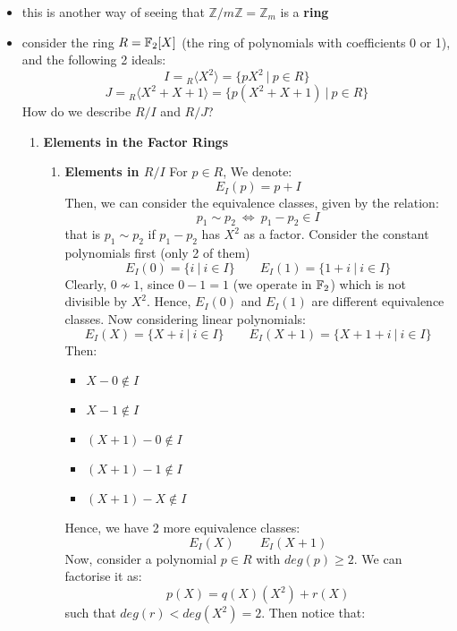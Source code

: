 \documentclass{exam}
\begin{document}
\begin{itemize}
    \item this is another way of seeing that $\mathbb{Z}/m\mathbb{Z} = \mathbb{Z}_m$ is a \textbf{ring}
    \item consider the ring $R = \mathbb{F}_2[X]$ (the ring of polynomials with coefficients 0 or 1), and the following 2 ideals:
    \[
    I = {}_R\langle X^2 \rangle = \{pX^2 \ | \ p \in R\}
    \]
    \[
    J = {}_R\langle X^2 + X + 1 \rangle = \{p(X^2 + X + 1) \ | \ p \in R\}
    \]
    How do we describe $R/I$ and $R/J$?
    \begin{enumerate}
        \item \textbf{Elements in the Factor Rings}
        \begin{enumerate}
            \item \textbf{Elements in $R/I$}
            For $p \in R$, We denote:
            \[
            E_I(p) = p + I
            \]
            Then, we can consider the equivalence classes, given by the relation:
            \[
            p_1 \sim p_2 \ \iff \ p_1 - p_2 \in I
            \]
            that is $p_1 \sim p_2$ if $p_1 - p_2$ has $X^2$ as a factor.
            Consider the constant polynomials first (only 2 of them)
            \[
            E_I(0) = \{i \ | \ i \in I\} \qquad E_I(1) = \{1 + i \ | \ i \in I\}
            \]
            Clearly, $0 \not\sim 1$, since $0 - 1 = 1$ (we operate in $\mathbb{F}_2$) which is not divisible by $X^2$. Hence, $E_I(0)$ and $E_I(1)$ are different equivalence classes.
            \bigskip
            Now considering linear polynomials:
            \[
            E_I(X) = \{X + i \ | \ i \in I\} \qquad E_I(X + 1) = \{X + 1 + i \ | \ i \in I\}
            \]
            Then:
            \begin{itemize}
                \item $X - 0 \not\in I$
                \item $X - 1 \not\in I$
                \item $(X + 1) - 0 \not\in I$
                \item $(X + 1) - 1 \not\in I$
                \item $(X + 1) - X \not\in I$
            \end{itemize}
            Hence, we have 2 more equivalence classes:
            \[
            E_I(X) \qquad E_I(X + 1)
            \]
            Now, consider a polynomial $p \in R$ with $deg(p) \geq 2$. We can factorise it as:
            \[
            p(X) = q(X)(X^2) + r(X)
            \]
            such that $deg(r) < deg(X^2) = 2$. Then notice that:

\end{enumerate}
\end{enumerate}
\end{itemize}
\end{document}
